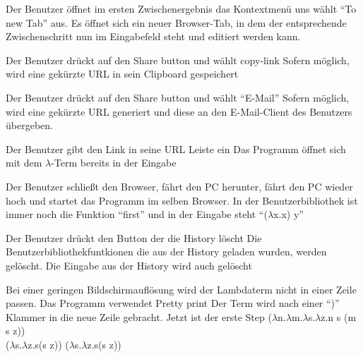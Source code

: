 \documentclass[parskip=full,11pt,twoside]{scrartcl}
\begin{document}
{Der Benutzer öffnet im ersten Zwischenergebnis das Kontextmenü uns wählt \enquote{To new Tab} aus.}
{Es öffnet sich ein neuer Browser-Tab, in dem der entsprechende Zwischenschritt nun im Eingabefeld steht und editiert werden kann.}

{ Der Benutzer drückt auf den Share button und wählt copy-link}
{ Sofern möglich, wird eine gekürzte URL in sein Clipboard gespeichert }

{ Der Benutzer drückt auf den Share button und wählt \enquote{E-Mail}}
{ Sofern möglich, wird eine gekürzte URL generiert und diese an den E-Mail-Client des Benutzers übergeben. }

{Der Benutzer gibt den Link in seine URL Leiste ein }
{ Das Programm öffnet sich mit dem $\lambda$-Term bereits in der Eingabe }

{Der Benutzer schließt den Browser, fährt den PC herunter, fährt den PC wieder hoch und startet das Programm im selben Browser.}
{In der Benutzerbibliothek ist immer noch die Funktion \enquote{first} und in der Eingabe steht \enquote{($\lambda$x.x) y}}

{Der Benutzer drückt den Button der die History löscht}
{Die Benutzerbibliothekfuntkionen die aus der History geladen wurden, werden gelöscht. Die Eingabe aus der History wird auch gelöscht}


{Bei einer geringen Bildschirmauflösung wird der Lambdaterm nicht in einer Zeile passen. Das Programm verwendet Pretty print }
{Der Term wird nach einer \enquote{)} Klammer in die neue Zeile gebracht. Jetzt ist der erste Step \newline ($\lambda$n.$\lambda$m.$\lambda$s.$\lambda$z.n s (m s z))
	\\
	($\lambda$s.$\lambda$z.s(s z)) ($\lambda$s.$\lambda$z.s(s z)) }
\end{document}
